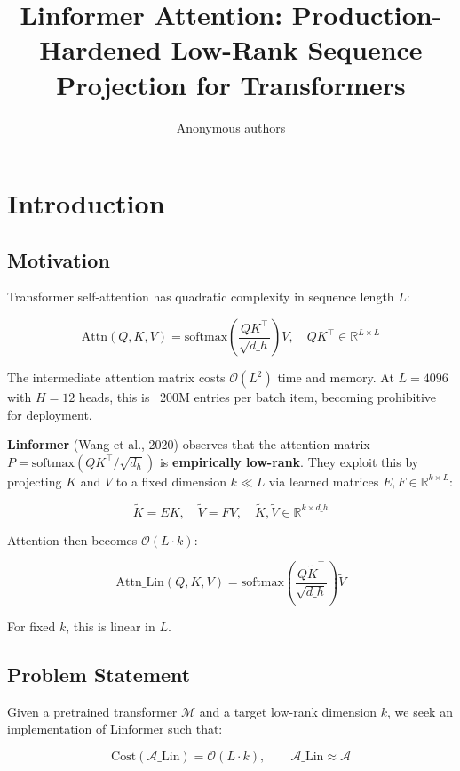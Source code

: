 \title{\textbf{Linformer Attention: Production-Hardened Low-Rank Sequence Projection for Transformers}}

\author{Anonymous authors}


\section{Introduction}

\subsection{Motivation}

Transformer self-attention has quadratic complexity in sequence length $L$:

\[
\text{Attn}(Q, K, V) = \text{softmax}\!\left(\frac{Q K^\top}{\sqrt{d\_h}}\right) V, 
\quad QK^\top \in \mathbb{R}^{L \times L}
\tag{1.1}
\]

The intermediate attention matrix costs $\mathcal{O}(L^2)$ time and memory. 
At $L = 4096$ with $H = 12$ heads, this is ~200M entries per batch item, 
becoming prohibitive for deployment.

\textbf{Linformer} (Wang et al., 2020) observes that the attention matrix 
$P = \text{softmax}(QK^\top/\sqrt{d_h})$ is \textbf{empirically low-rank}. They 
exploit this by projecting $K$ and $V$ to a fixed dimension $k \ll L$ via 
learned matrices $E, F \in \mathbb{R}^{k \times L}$:

\[
\tilde{K} = E K, \quad \tilde{V} = F V, \quad \tilde{K}, \tilde{V} \in \mathbb{R}^{k \times d\_h}
\tag{1.2}
\]

Attention then becomes $\mathcal{O}(L \cdot k)$:

\[
\text{Attn}\_\text{Lin}(Q, K, V) = \text{softmax}\!\left(\frac{Q \tilde{K}^\top}{\sqrt{d\_h}}\right) \tilde{V}
\tag{1.3}
\]

For fixed $k$, this is linear in $L$.

\subsection{Problem Statement}

Given a pretrained transformer $\mathcal{M}$ and a target low-rank dimension 
$k$, we seek an implementation of Linformer such that:

\[
\text{Cost}(\mathcal{A}\_\text{Lin}) = \mathcal{O}(L \cdot k), \qquad
\mathcal{A}\_\text{Lin} \approx \mathcal{A}
\tag{1.4}
\]

